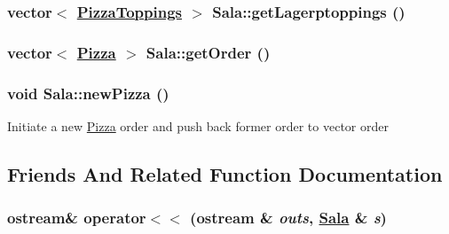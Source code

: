 \hypertarget{class_sala_aeb754b87d63d395a61539294cbdf064}{
\subsubsection[getLagerptoppings]{\setlength{\rightskip}{0pt plus 5cm}vector$<$ \hyperlink{class_pizza_toppings}{Pizza\-Toppings} $>$ Sala::get\-Lagerptoppings ()}}
\label{class_sala_aeb754b87d63d395a61539294cbdf064}


\hypertarget{class_sala_71e41a58a2a9c2d1927676693909a42c}{
\subsubsection[getOrder]{\setlength{\rightskip}{0pt plus 5cm}vector$<$ \hyperlink{class_pizza}{Pizza} $>$ Sala::get\-Order ()}}
\label{class_sala_71e41a58a2a9c2d1927676693909a42c}


\hypertarget{class_sala_eadce54d849ca6634b7fdd389bd8f192}{
\subsubsection[newPizza]{\setlength{\rightskip}{0pt plus 5cm}void Sala::new\-Pizza ()}}
\label{class_sala_eadce54d849ca6634b7fdd389bd8f192}


Initiate a new \hyperlink{class_pizza}{Pizza} order and push back former order to vector order 

\subsection{Friends And Related Function Documentation}
\hypertarget{class_sala_b32b27b19243c1cf7bcfffe604ea1736}{
\subsubsection[operator$<$$<$]{\setlength{\rightskip}{0pt plus 5cm}ostream\& operator$<$$<$ (ostream \& {\em outs}, \hyperlink{class_sala}{Sala} \& {\em s})}}
\label{class_sala_b32b27b19243c1cf7bcfffe604ea1736}




